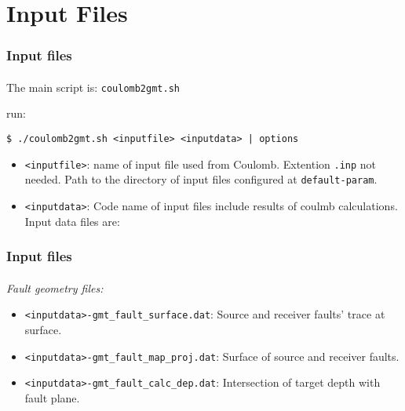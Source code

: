 \section[Inputs]{Input Files}
 
\graphicspath{{Chapter2/Figs/Vector/}{Chapter2/Figs/Raster/}}

\begin{frame}[t,fragile]
  \frametitle{Input files}
  \framesubtitle{}
  \label{fr2:satgeod3}
The main script is: \texttt{coulomb2gmt.sh}

run:

\begin{verbatim}
$ ./coulomb2gmt.sh <inputfile> <inputdata> | options
\end{verbatim}

\begin{itemize}
\item
  \texttt{\textless{}inputfile\textgreater{}}: name of input file used
  from Coulomb. Extention \texttt{.inp} not needed. Path to the
  directory of input files configured at \texttt{default-param}.
\item
  \texttt{\textless{}inputdata\textgreater{}}: Code name of input files
  include results of coulmb calculations. Input data files are:
\end{itemize}
\end{frame}
\note{} %

\begin{frame}[t,fragile]
  \frametitle{Input files}
  \framesubtitle{}
  \label{fr2:satgeod3}
\emph{Fault geometry files:}

\begin{itemize}
\item
  \texttt{\textless{}inputdata\textgreater{}-gmt\_fault\_surface.dat}:
  Source and receiver faults' trace at surface.
\item
  \texttt{\textless{}inputdata\textgreater{}-gmt\_fault\_map\_proj.dat}:
  Surface of source and receiver faults.
\item
  \texttt{\textless{}inputdata\textgreater{}-gmt\_fault\_calc\_dep.dat}:
  Intersection of target depth with fault plane.
\end{itemize}
\end{frame}
\note{} %



